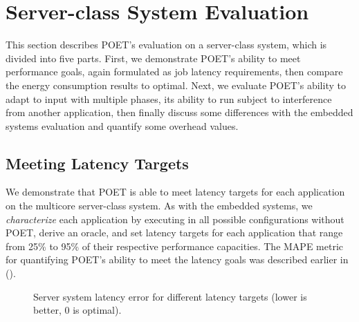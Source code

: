 \section{Server-class System Evaluation}
\label{sec:poet-server-evaluation}

This section describes POET's evaluation on a server-class system, which is divided into five parts.
First, we demonstrate POET's ability to meet performance goals, again formulated as job latency requirements, then compare the energy consumption results to optimal.
Next, we evaluate POET's ability to adapt to input with multiple phases, its ability to run subject to interference from another application, then finally discuss some differences with the embedded systems evaluation and quantify some overhead values.


\subsection{Meeting Latency Targets}

We demonstrate that POET is able to meet latency targets for each application on the multicore server-class system.
As with the embedded systems, we \emph{characterize} each application by executing in all possible configurations without POET, derive an oracle, and set latency targets for each application that range from 25\% to 95\% of their respective performance capacities.
The MAPE metric for quantifying POET's ability to meet the latency goals was described earlier in  ().

\begin{figure}[t]
  \centering
    
  \caption{Server system latency error for different latency targets (lower is better, 0 is optimal).}
  \label{fig:poet-mape-server}
\end{figure}

